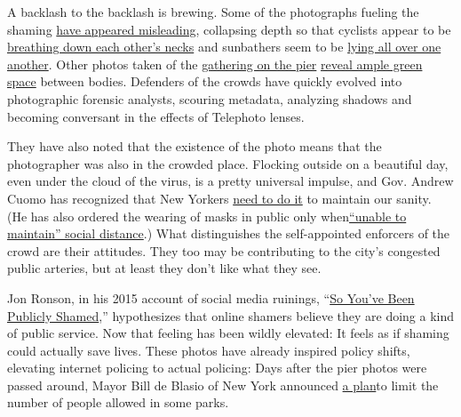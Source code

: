 A backlash to the backlash is brewing. Some of the photographs fueling
the shaming
\href{https://www.buzzfeed.com/joeydurso/coronavirus-social-distancing-lockdown-photos}{have
appeared misleading}, collapsing depth so that cyclists appear to be
\href{https://road.cc/content/news/times-latest-paper-try-shame-cyclists-dodgy-pics-272525}{breathing
down each other's necks} and sunbathers seem to be
\href{https://petapixel.com/2020/05/02/controversial-photo-of-crowds-on-ca-beach-was-shot-with-a-telephoto-lens/?fbclid=IwAR2rFh0hA_HqeI_7BUV9lgLhyuEnbI8qQJaradf-HMDSHNoZgoWQNJExytc}{lying
all over one another}. Other photos taken of the
\href{https://www.instagram.com/p/B_vdTP3DeHC/?utm_source=ig_embed}{gathering
on the pier}
\href{https://www.instagram.com/p/B_vWvBnDdRN/?igshid=tjlen2z39jvu}{reveal
ample green space} between bodies. Defenders of the crowds have quickly
evolved into photographic forensic analysts, scouring metadata,
analyzing shadows and becoming conversant in the effects of Telephoto
lenses.

They have also noted that the existence of the photo means that the
photographer was also in the crowded place. Flocking outside on a
beautiful day, even under the cloud of the virus, is a pretty universal
impulse, and Gov. Andrew Cuomo has recognized that New Yorkers
\href{https://www.nytimes3xbfgragh.onion/article/what-is-shelter-in-place-coronavirus.html}{need
to do it} to maintain our sanity. (He has also ordered the wearing of
masks in public only
when\href{https://www.governor.ny.gov/news/no-20217-continuing-temporary-suspension-and-modification-laws-relating-disaster-emergency}{``unable
to maintain'' social distance}.) What distinguishes the self-appointed
enforcers of the crowd are their attitudes. They too may be contributing
to the city's congested public arteries, but at least they don't like
what they see.

Jon Ronson, in his 2015 account of social media ruinings,
``\href{https://www.nytimes3xbfgragh.onion/2015/04/19/books/review/jon-ronsons-so-youve-been-publicly-shamed.html}{So
You've Been Publicly Shamed},'' hypothesizes that online shamers believe
they are doing a kind of public service. Now that feeling has been
wildly elevated: It feels as if shaming could actually save lives. These
photos have already inspired policy shifts, elevating internet policing
to actual policing: Days after the pier photos were passed around, Mayor
Bill de Blasio of New York announced
\href{https://www.nytimes3xbfgragh.onion/2020/05/08/nyregion/coronavirus-new-york-update.html\#link-368d0d35}{a
plan}to limit the number of people allowed in some parks.

